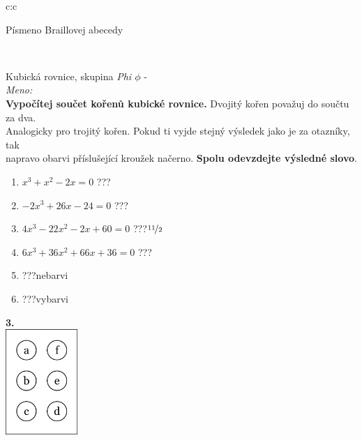 \documentclass[10pt]{report}
\begin{document}
\begin{tabular}{c:c}
\begin{minipage}[c][99mm][t]{0.49\linewidth}
\begin{center}
\begin{minipage}{0.20\linewidth}
\begin{center}
{\small Písmeno Braillovej abecedy}
\end{center}
\end{minipage}
\end{center}
\end{minipage}
\\ \hdashline
\begin{minipage}[c][99mm][t]{0.49\linewidth}
\begin{center}
\vspace{7mm}
{\huge Kubická rovnice, skupina \textit{Phi $\phi$} -}\\[4.5mm]
\textit{Meno:}\phantom{xxxxxxxxxxxxxxxxxxxxxxxxxxxxxxxxxxxxxxxxxxxxxxxxxxxxxxxxxxxxxxxxx}\\[3.5mm]
\textbf{Vypočítej součet kořenů kubické rovnice.} Dvojitý kořen považuj do součtu za dva.\\Analogicky pro trojitý kořen. Pokud ti vyjde stejný výsledek jako je za otazníky, tak\\napravo obarvi příslušející kroužek načerno. \textbf{Spolu odevzdejte výsledné slovo}.\\[3mm]
\begin{minipage}{0.77\linewidth}
\begin{center}
\begin{varwidth}{\textwidth}
\begin{enumerate}
\large
\item $x^3+x^2-2x=0$\quad \dotfill\; ???\;\dotfill {}
\item $-2x^3+26x-24=0$\quad \dotfill\; ???\;\dotfill {}
\item $4x^3-22x^2-2x+60=0$\quad \dotfill\; ???\;\dotfill \quad $\nicefrac{11}{2}$
\item $6x^3+36x^2+66x+36=0$\quad \dotfill\; ???\;\dotfill {}
\item \quad \dotfill\; ???\;\dotfill \quad nebarvi
\item \quad \dotfill\; ???\;\dotfill \quad vybarvi
\end{enumerate}
\end{varwidth}
\end{center}
\end{minipage}
\begin{minipage}{0.20\linewidth}
\begin{center}
{\Huge\bfseries 3.} \\[2mm]
\includegraphics[height=40mm]{../images/braille.png}

\end{center}
\end{minipage}
\end{center}
\end{minipage}
\end{tabular}
\end{document}
